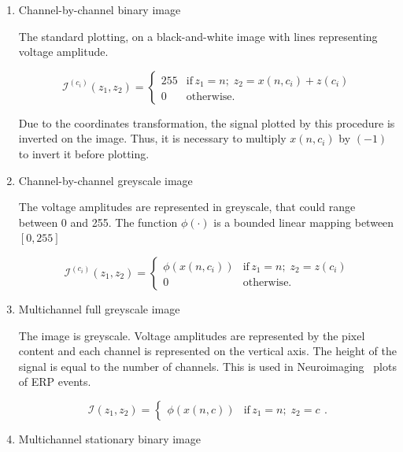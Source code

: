 \begin{enumerate}
\item Channel-by-channel binary image

The standard plotting, on a black-and-white image with lines representing voltage amplitude.

\begin{equation}
\mathcal{I}^{(c_i)}(z_1,z_2)= \left\{ \begin{array}{rl}
255 & \text{if} \,  z_1 =  n; \; z_2 = x(n,c_i) + z(c_i) \\
0   & \mbox{otherwise}.
\end{array}\right.
\label{eq:image1}
\end{equation}

Due to the coordinates transformation, the signal plotted by this procedure is inverted on the image.  Thus, it is necessary to multiply $x(n,c_i)$ by $(-1)$ to invert it before plotting.

\item Channel-by-channel greyscale image

The voltage amplitudes are represented in greyscale, that could range between 0 and 255.  The function $\phi( \cdot )$ is a bounded linear mapping between $\left[ 0,255 \right]$

\begin{equation}
\mathcal{I}^{(c_i)}(z_1,z_2)= \left\{ \begin{array}{rl}
\phi(x(n,c_i)) & \text{if} \,  z_1 = n; \; z_2 = z(c_i) \\
0   & \mbox{otherwise}.
\end{array}\right.
\label{eq:image2}
\end{equation}

\item Multichannel full greyscale image

The image is greyscale. Voltage amplitudes are represented by the pixel content and each channel is represented on the vertical axis.  The height of the signal is equal to the number of channels.   This is used in Neuroimaging~\cite{Freeman2013} plots of ERP events.

\begin{equation}
\mathcal{I}(z_1,z_2) = \left\{ \begin{array}{rl} \phi(x(n,c))  & \text{if} \,  z_1 = n; \; z_2 = c \end{array}\right. .
\label{eq:image3}
\end{equation}


\item Multichannel stationary binary image


\end{enumerate}
